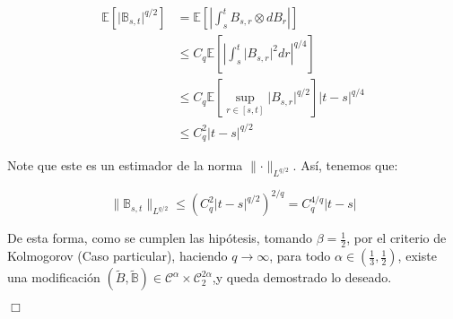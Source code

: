 \begin{itemize}
	\begin{align*}
		\mathbb{E}[ \lvert \mathbb{B}_{s,t} \rvert^{q/2} ] &= \mathbb{E} \left[ \left\lvert \int_s^t B_{s,r} \otimes dB_r \right\rvert \right] \\
		&\leq C_q \mathbb{E} \left[ \left\lvert \int_s^t \lvert B_{s,r} \rvert^2 dr \right\rvert^{q/4} \right] \\
		&\leq C_q \mathbb{E}\left[  \sup_{r \in [s,t]} \lvert B_{s,r} \rvert^{q/2} \right] \lvert t- s \rvert^{q/4} \\
		&\leq C_q^2 \lvert t - s \rvert^{q/2}
	\end{align*}

	Note que este es un estimador de la norma $\lVert \cdot \rVert_{L^{q/2}}$. Así, tenemos que:

	\[
		\lVert \mathbb{B}_{s,t} \rVert_{L^{q/2}} \leq \left( C_q^2 \lvert t- s \rvert^{q/2} \right)^{2/q} = C_q^{4/q} \lvert t- s\rvert
	\]
 

\end{itemize}

De esta forma, como se cumplen las hipótesis, tomando $\beta = \frac{1}{2}$, por el criterio de Kolmogorov (Caso particular), haciendo $q \rightarrow \infty$, para todo $\alpha \in \left( \frac{1}{3}, \frac{1}{2} \right)$, existe una modificación $(\tilde{B}, \tilde{\mathbb{B}}) \in \mathcal{C}^{\alpha} \times \mathcal{C}^{2\alpha}_2$,y queda  demostrado lo deseado.

\begin{flushright}
	$\Box$
\end{flushright}


